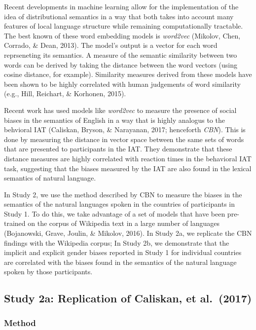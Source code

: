 \documentclass[10pt, letterpaper]{article}
\begin{document}
Recent developments in machine learning allow for the implementation of
the idea of distributional semantics in a way that both takes into
account many features of local language structure while remaining
computationally tractable. The best known of these word embedding models
is \emph{word2vec} (Mikolov, Chen, Corrado, \& Dean, 2013). The model's
output is a vector for each word reprseneting its semantics. A measure
of the semantic similarity between two words can be derived by taking
the distance between the word vectors (using cosine distance, for
example). Similarity measures derived from these models have been shown
to be highly correlated with human judgements of word similarity (e.g.,
Hill, Reichart, \& Korhonen, 2015).

Recent work has used models like \emph{word2vec} to measure the presence
of social biases in the semantics of English in a way that is highly
analogus to the behvioral IAT (Caliskan, Bryson, \& Narayanan, 2017;
henceforth \emph{CBN}). This is done by measuring the distance in vector
space between the same sets of words that are presented to participants
in the IAT. They demonstrate that these distance measures are highly
correlated with reaction times in the behavioral IAT task, suggesting
that the biases measured by the IAT are also found in the lexical
semantics of natural language.

In Study 2, we use the method described by CBN to measure the biases in
the semantics of the natural languages spoken in the countries of
participants in Study 1. To do this, we take advantage of a set of
models that have been pre-trained on the corpus of Wikipedia text in a
large number of languages (Bojanowski, Grave, Joulin, \& Mikolov, 2016).
In Study 2a, we replicate the CBN findings with the Wikipedia corpus; In
Study 2b, we demonstrate that the implicit and explicit gender biases
reported in Study 1 for individual countries are correlated with the
biases found in the semantics of the natural language spoken by those
participants.

\subsection{Study 2a: Replication of Caliskan, et
al.~(2017)}\label{study-2a-replication-of-caliskan-et-al.2017}

\subsubsection{Method}\label{method-1}
\end{document}
